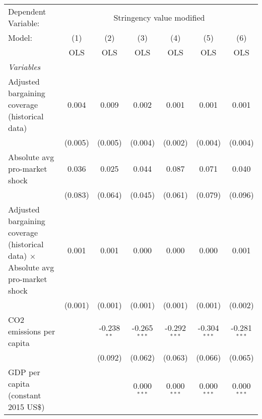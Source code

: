 
\begingroup
\centering
\begin{tabular}{lcccccc}
   \toprule
   Dependent Variable: & \multicolumn{6}{c}{Stringency value modified}\\
   Model:                                                                                 & (1)     & (2)           & (3)            & (4)            & (5)            & (6)\\  
                                                                                          &  OLS    & OLS           & OLS            & OLS            & OLS            & OLS\\  
   \midrule
   \emph{Variables}\\
   Adjusted bargaining coverage (historical data)                                         & 0.004   & 0.009         & 0.002          & 0.001          & 0.001          & 0.001\\   
                                                                                          & (0.005) & (0.005)       & (0.004)        & (0.002)        & (0.004)        & (0.004)\\   
   Absolute avg pro-market shock                                                          & 0.036   & 0.025         & 0.044          & 0.087          & 0.071          & 0.040\\   
                                                                                          & (0.083) & (0.064)       & (0.045)        & (0.061)        & (0.079)        & (0.096)\\   
   Adjusted bargaining coverage (historical data) $\times$ Absolute avg pro-market shock  & 0.001   & 0.001         & 0.000          & 0.000          & 0.000          & 0.001\\   
                                                                                          & (0.001) & (0.001)       & (0.001)        & (0.001)        & (0.001)        & (0.002)\\   
   CO2 emissions per capita                                                               &         & -0.238$^{**}$ & -0.265$^{***}$ & -0.292$^{***}$ & -0.304$^{***}$ & -0.281$^{***}$\\   
                                                                                          &         & (0.092)       & (0.062)        & (0.063)        & (0.066)        & (0.065)\\   
   GDP per capita (constant 2015 US\$)                                                    &         &               & 0.000$^{***}$  & 0.000$^{***}$  & 0.000$^{***}$  & 0.000$^{***}$\\   

\end{tabular}
